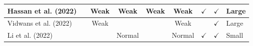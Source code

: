 \documentclass[../access.tex]{subfiles}
\begin{document}
\begin{table}[htbp]
\begin{adjustwidth}{-2cm}{}
\begin{tabular}{m{4.4cm} c c c c c c c >{\centering\arraybackslash}m{0.7cm}}
                    \hline
                    \footnotesize{Hassan et al. (2022) \cite{Hassan2022}} & {} & {Weak} & {Weak} & {Weak} & {Weak} & $ \checkmark $ & $ \checkmark $ & \footnotesize{Large} \\
                    \hline
                    \footnotesize{Vidwans et al. (2022) \cite{Vidwans2022}} & {} & {Weak} & {} & {} & {Weak} & {} & $ \checkmark $ & \footnotesize{Large} \\
                    \hline
                    \footnotesize{Li et al. (2022) \cite{Li2022}} & {} & {} & {Normal} & {} & {Normal} & $ \checkmark $ & $ \checkmark $ & \footnotesize{Small} \\
                    \bottomrule
                \end{tabular}
            \end{adjustwidth}
            \label{tbl:table4}
        \end{table}
\end{document}
